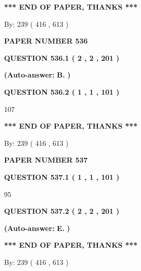 \documentclass{ctexart}
\begin{document}
 
   
   
   
   
\vspace{1.0in} 
{\textbf{\large{ *** END OF PAPER, THANKS *** }}} 
   
   
\hspace{1.0in} By: 
 239 ( 416 ,  613 )
   
   
   
   
\newpage 
\setcounter{page}{ 
   536001 } 
   
   
 {\textbf{ \Large{ PAPER NUMBER  536  }}}
   
   
   
   
  
  
{\textbf{\large{QUESTION
536.1 
 ( 2 , 2 , 201 )
}}}
 
 
{\textbf{(Auto-answer:}}
{\textbf{\large{
B.}}}
{\textbf{)}}
 
 
  
  
{\textbf{\large{QUESTION
536.2 
 ( 1 , 1 , 101 )
}}}

107
   
   
   
   
\vspace{1.0in} 
{\textbf{\large{ *** END OF PAPER, THANKS *** }}} 
   
   
\hspace{1.0in} By: 
 239 ( 416 ,  613 )
   
   
   
   
\newpage 
\setcounter{page}{ 
   537001 } 
   
   
 {\textbf{ \Large{ PAPER NUMBER  537  }}}
   
   
   
   
  
  
{\textbf{\large{QUESTION
537.1 
 ( 1 , 1 , 101 )
}}}

95
  
  
{\textbf{\large{QUESTION
537.2 
 ( 2 , 2 , 201 )
}}}
 
 
{\textbf{(Auto-answer:}}
{\textbf{\large{
E.}}}
{\textbf{)}}
 
 
   
   
   
   
\vspace{1.0in} 
{\textbf{\large{ *** END OF PAPER, THANKS *** }}} 
   
   
\hspace{1.0in} By: 
 239 ( 416 ,  613 )
   
   
   
   
\newpage 
\setcounter{page}{ 
   538001 } 
   
\end{document}
